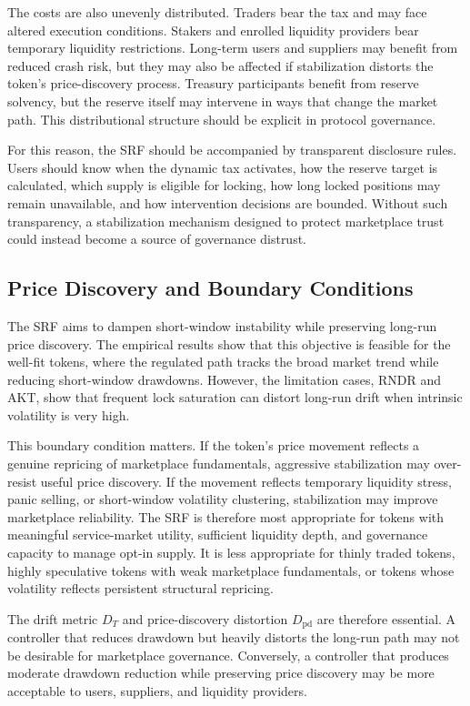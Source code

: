 \documentclass[a4paper,fleqn]{cas-dc}
\begin{document}
The costs are also unevenly distributed. Traders bear the tax and may face altered execution conditions. Stakers and enrolled liquidity providers bear temporary liquidity restrictions. Long-term users and suppliers may benefit from reduced crash risk, but they may also be affected if stabilization distorts the token's price-discovery process. Treasury participants benefit from reserve solvency, but the reserve itself may intervene in ways that change the market path. This distributional structure should be explicit in protocol governance.

For this reason, the SRF should be accompanied by transparent disclosure rules. Users should know when the dynamic tax activates, how the reserve target is calculated, which supply is eligible for locking, how long locked positions may remain unavailable, and how intervention decisions are bounded. Without such transparency, a stabilization mechanism designed to protect marketplace trust could instead become a source of governance distrust.

\subsection{Price Discovery and Boundary Conditions}
\label{subsec:discussion_price_discovery}

The SRF aims to dampen short-window instability while preserving long-run price discovery. The empirical results show that this objective is feasible for the well-fit tokens, where the regulated path tracks the broad market trend while reducing short-window drawdowns. However, the limitation cases, RNDR and AKT, show that frequent lock saturation can distort long-run drift when intrinsic volatility is very high.

This boundary condition matters. If the token's price movement reflects a genuine repricing of marketplace fundamentals, aggressive stabilization may over-resist useful price discovery. If the movement reflects temporary liquidity stress, panic selling, or short-window volatility clustering, stabilization may improve marketplace reliability. The SRF is therefore most appropriate for tokens with meaningful service-market utility, sufficient liquidity depth, and governance capacity to manage opt-in supply. It is less appropriate for thinly traded tokens, highly speculative tokens with weak marketplace fundamentals, or tokens whose volatility reflects persistent structural repricing.

The drift metric \(D_T\) and price-discovery distortion \(D_{\mathrm{pd}}\) are therefore essential. A controller that reduces drawdown but heavily distorts the long-run path may not be desirable for marketplace governance. Conversely, a controller that produces moderate drawdown reduction while preserving price discovery may be more acceptable to users, suppliers, and liquidity providers.
\end{document}
